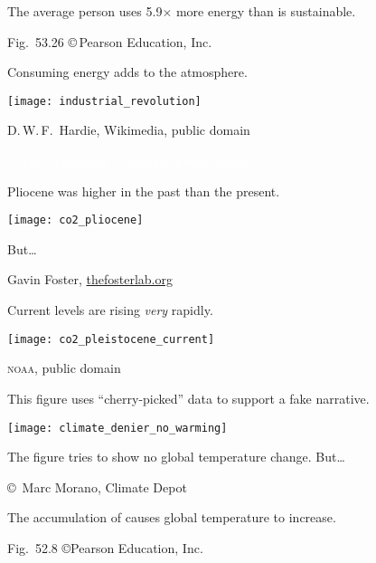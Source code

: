 \documentclass[t]{beamer}
\begin{document}
{
\begin{frame}[b]{The average person uses 5.9$\times$ more energy than is sustainable.}

	\hfill \tiny Fig.~53.26 \copyright\,Pearson Education, Inc.
\end{frame}
}

%
\begin{frame}[t]{Consuming energy adds  to the atmosphere.}

	\texttt{[image: industrial\_revolution]}

	\vfilll
	
	\hfill \tiny D.\,W.\,F.~Hardie, Wikimedia, public domain

\end{frame}
%
{
\begin{frame}[b]

	\hfill \tiny \textcolor{white}{\textsc{us epa}, Wikimedia Commons, public domain}
\end{frame}
}
%
\begin{frame}{Pliocene  was higher in the past than the present.}
	
	\texttt{[image: co2\_pliocene]}\par
	
	\hangpara But\dots
	
	\vfilll
	
	\hfill \tiny Gavin Foster, \href{http://www.thefosterlab.org/blog/2015/11/11/is-this-the-last-year-below-400-ppm}{thefosterlab.org}
\end{frame}
%
\begin{frame}{Current  levels are rising \emph{very} rapidly.}
	
	{\centering
		\texttt{[image: co2\_pleistocene\_current]}\par
	}
	
	\vfilll
	
	\hfill \tiny \textsc{noaa}, public domain
\end{frame}
%
\begin{frame}[t]{This figure uses “cherry-picked” data to support a fake narrative.}
	
	{\centering
		\texttt{[image: climate\_denier\_no\_warming]}\par
	}
	
	The figure tries to show no global temperature change. But\dots
	
	\vfilll
	
	\hfill \tiny \copyright~Marc Morano, Climate Depot
\end{frame}
%
{
\begin{frame}[b]{The accumulation of  causes global temperature to increase.}

	\hfill \tiny Fig.~52.8 \copyright Pearson Education, Inc.
\end{frame}
}
%
\end{document}
